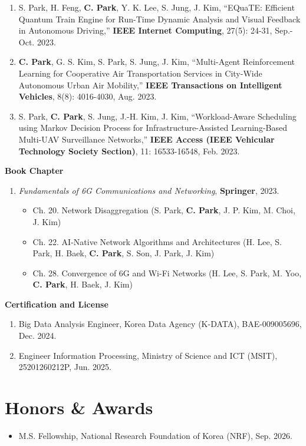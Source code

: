 \documentclass[10.5pt,a4paper]{article}
\begin{document}
\begin{enumerate}[leftmargin=1.4em, itemsep=3pt, topsep=2pt]
  \item S. Park, H. Feng, \textbf{C. Park}, Y. K. Lee, S. Jung, J. Kim, ``EQuaTE: Efficient Quantum Train Engine for Run-Time Dynamic Analysis and Visual Feedback in Autonomous Driving,'' \textbf{IEEE Internet Computing}, 27(5): 24-31, Sep.-Oct. 2023.
  \item \textbf{C. Park}, G. S. Kim, S. Park, S. Jung, J. Kim, ``Multi-Agent Reinforcement Learning for Cooperative Air Transportation Services in City-Wide Autonomous Urban Air Mobility,'' \textbf{IEEE Transactions on Intelligent Vehicles}, 8(8): 4016-4030, Aug. 2023.
  \item S. Park, \textbf{C. Park}, S. Jung, J.-H. Kim, J. Kim, ``Workload-Aware Scheduling using Markov Decision Process for Infrastructure-Assisted Learning-Based Multi-UAV Surveillance Networks,'' \textbf{IEEE Access (IEEE Vehicular Technology Society Section)}, 11: 16533-16548, Feb. 2023.
\end{enumerate}

\textbf{Book Chapter}
\begin{enumerate}[leftmargin=1.4em, itemsep=3pt, topsep=2pt]
  \item \textit{Fundamentals of 6G Communications and Networking}, \textbf{Springer}, 2023.
  \begin{itemize}
    \item Ch. 20. Network Disaggregation (S. Park, \textbf{C. Park}, J. P. Kim, M. Choi, J. Kim)
    \item Ch. 22. AI-Native Network Algorithms and Architectures (H. Lee, S. Park, H. Baek, \textbf{C. Park}, S. Son, J. Park, J. Kim)
    \item Ch. 28. Convergence of 6G and Wi-Fi Networks (H. Lee, S. Park, M. Yoo, \textbf{C. Park}, H. Baek, J. Kim)
  \end{itemize}
\end{enumerate}

\textbf{Certification and License}
\begin{enumerate}[leftmargin=1.4em, itemsep=3pt, topsep=2pt]
  \item Big Data Analysis Engineer, Korea Data Agency (K-DATA), BAE-009005696, Dec. 2024.
  \item Engineer Information Processing, Ministry of Science and ICT (MSIT), 25201260212P, Jun. 2025.
\end{enumerate}

\section*{Honors \& Awards}
\begin{itemize}[leftmargin=1.1em, itemsep=1pt, topsep=2pt]
  \item M.S. Fellowship, National Research Foundation of Korea (NRF), Sep. 2026.
\end{itemize}
\end{document}
